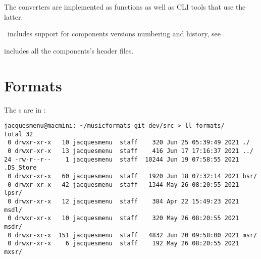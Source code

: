 The converters are implemented as functions as well as CLI tools that use the latter.

\mf\ includes support for components versions numbering and history, see .

 includes all the components's header files.


\section{Formats}

The \format s are in :
\begin{lstlisting}[language=Terminal]
jacquesmenu@macmini: ~/musicformats-git-dev/src > ll formats/
total 32
 0 drwxr-xr-x   10 jacquesmenu  staff    320 Jun 25 05:39:49 2021 ./
 0 drwxr-xr-x   13 jacquesmenu  staff    416 Jun 17 17:16:37 2021 ../
24 -rw-r--r--    1 jacquesmenu  staff  10244 Jun 19 07:58:55 2021 .DS_Store
 0 drwxr-xr-x   60 jacquesmenu  staff   1920 Jun 18 07:32:14 2021 bsr/
 0 drwxr-xr-x   42 jacquesmenu  staff   1344 May 26 08:20:55 2021 lpsr/
 0 drwxr-xr-x   12 jacquesmenu  staff    384 Apr 22 15:49:23 2021 msdl/
 0 drwxr-xr-x   10 jacquesmenu  staff    320 May 26 08:20:55 2021 msdr/
 0 drwxr-xr-x  151 jacquesmenu  staff   4832 Jun 20 09:58:00 2021 msr/
 0 drwxr-xr-x    6 jacquesmenu  staff    192 May 26 08:20:55 2021 mxsr/
\end{lstlisting}


